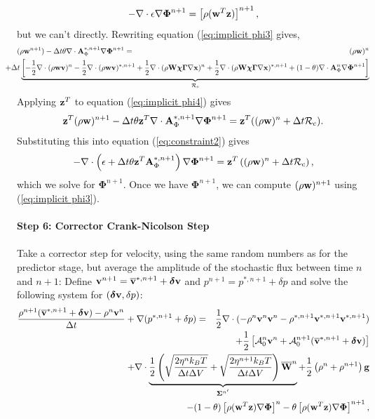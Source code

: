 \documentclass[final]{siamltex}
\def\Ab {{\bf A}}
\def\gb {{\bf g}}
\def\vb {{\bf v}}
\def\wb {{\bf w}}
\def\Wb {{\bf W}}
\def\xb {{\bf x}}
\def\zb {{\bf z}}
\def\chib   {\boldsymbol{\chi}}
\def\deltab {\boldsymbol{\delta}}
\def\Gammab {\boldsymbol{\Gamma}}
\def\Phib   {\boldsymbol{\Phi}}
\def\Sigmab {\boldsymbol{\Sigma}}
\def\half   {\frac{1}{2}}
\begin{document}
\begin{equation}
-\nabla\cdot\epsilon\nabla\Phib^{n+1} = \left[\rho(\wb^T\zb)\right]^{n+1},\label{eq:constraint2}
\end{equation}
but we can't directly.  Rewriting equation (\ref{eq:implicit phi3} gives,
\begin{eqnarray}
(\rho\wb^{n+1}) - \Delta t\theta\nabla\cdot \Ab_\Phi^{*,n+1}\nabla\Phib^{n+1} &=& (\rho\wb)^n\nonumber\\
&&\hspace{-2.5in}+ \Delta t\underbrace{\left[-\half\nabla\cdot(\rho\wb\vb)^n - \half\nabla\cdot(\rho\wb\vb)^{*,n+1} + \half\nabla\cdot(\rho\Wb\chib\Gammab\nabla\xb)^n + \half\nabla\cdot(\rho\Wb\chib\Gammab\nabla\xb)^{*,n+1}+ (1-\theta)\nabla\cdot \Ab_\Phi^n\nabla\Phib^{n+1} \right]}_{\mathcal{R}_c}\label{eq:implicit phi4}\nonumber\\
\end{eqnarray}
Applying $\zb^T$ to equation (\ref{eq:implicit phi4}) gives
\begin{equation}
\zb^T(\rho\wb)^{n+1} - \Delta t\theta\zb^T\nabla\cdot \Ab_\Phi^{*,n+1}\nabla\Phib^{n+1} = \zb^T((\rho\wb)^n + \Delta t\mathcal{R}_c).
\end{equation}
Substituting this into equation (\ref{eq:constraint2}) gives
\begin{equation}
-\nabla\cdot\left(\epsilon + \Delta t\theta\zb^T \Ab_\Phi^{*,n+1}\right)\nabla\Phib^{n+1} = \zb^T\left((\rho\wb)^n + \Delta t\mathcal{R}_c\right),
\end{equation}
which we solve for $\Phib^{n+1}$.  Once we have $\Phib^{n+1}$, we can compute 
$(\rho\wb)^{n+1}$ using (\ref{eq:implicit phi3}).\\ \\
{\bf Step 6: Corrector Crank-Nicolson Step}\\ \\
Take a corrector step for velocity, using the same random numbers as for the predictor
stage, but average the amplitude of the stochastic flux between time $n$ and $n+1$:
Define $\vb^{n+1} = \overline\vb^{*,n+1} + \deltab\vb$ and $p^{n+1} = p^{*,n+1} + \delta p$ and
solve the following system for $(\deltab\vb,\delta p)$:
\begin{eqnarray}
\frac{\rho^{n+1}(\overline\vb^{*,n+1} + \deltab\vb) - \rho^n\vb^n}{\Delta t} + \nabla(p^{*,n+1}+\delta p) &=& \half\nabla\cdot(-\rho^n\vb^n\vb^n - \rho^{*,n+1}\vb^{*,n+1}\vb^{*,n+1})\nonumber\\
&&\hspace{-1.5in}+ \half\left[\mathcal{A}_0^n\vb^n + \mathcal{A}_0^{n+1}(\overline\vb^{*,n+1} + \deltab\vb)\right]\nonumber\\
&&\hspace{-1.5in}+ \nabla\cdot\underbrace{\half\left(\sqrt{\frac{2\eta^n k_B T}{\Delta t\Delta V}} + \sqrt{\frac{2\eta^{n+1} k_B T}{\Delta t\Delta V}}\right)\overline\Wb^n}_{\Sigmab^{n'}} + \half\left(\rho^n+\rho^{n+1}\right)\gb\nonumber\\
&&\hspace{-1.5in} - (1-\theta)\left[\rho(\wb^T\zb)\nabla\Phib\right]^n - \theta\left[\rho(\wb^T\zb)\nabla\Phib\right]^{n+1},
\end{eqnarray}
\end{document}
